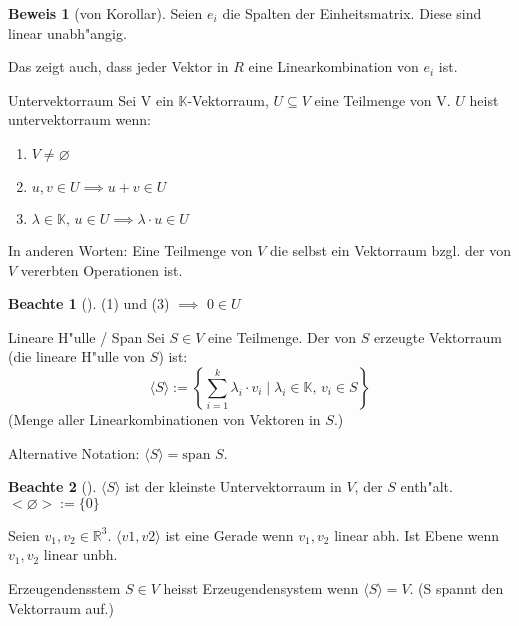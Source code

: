 \documentclass[oneside,fontsize=11pt,paper=a4,BCOR=0mm,DIV=12,automark,headsepline]{scrbook}
\theoremstyle{remark}
\theoremstyle{definition}
\newtheorem*{notte}{Beachte}
\theoremstyle{definition}
\newtheorem*{prof}{Beweis}
\theoremstyle{remark}
\begin{document}
\begin{prof}[von Korollar]
  Seien \(e_i\) die Spalten der Einheitsmatrix. Diese sind linear unabh"angig. 

  Das zeigt auch, dass jeder Vektor in \(R\) eine Linearkombination von \(e_i\) ist. 
\end{prof}

\begin{definition}{Untervektorraum}{}
  Sei V ein \(\mathbb{K}\)-Vektorraum, \(U\subseteq V\) eine Teilmenge von V. \(U\) heist
  untervektorraum wenn:
  \begin{enumerate}
  \item \(V\not= \varnothing\)
  \item $u, v \in U \implies u+v \in U$

  \item $\lambda \in \mathbb{K},\, u \in U \implies \lambda \cdot u \in U $
  \end{enumerate}

  In anderen Worten: Eine Teilmenge von \(V\) die selbst ein Vektorraum bzgl.
  der von \(V\) vererbten Operationen ist.
\end{definition}

\begin{notte}[]
  (1) und (3) \(\implies\) \(0\in U\)
\end{notte}

\begin{definition}{Lineare H"ulle / Span}{}
  Sei \(S \in V\) eine Teilmenge. Der von \(S\) erzeugte Vektorraum (die lineare H"ulle
  von \(S\)) ist: \[\langle S \rangle:=\left\{\sum_{i=1}^k{\lambda_i \cdot v_i}\mid \lambda_i \in \mathbb{K}, \, v_i \in S \right\}\] (Menge aller Linearkombinationen von Vektoren in \(S\).)

  Alternative Notation: \(\langle S \rangle=\text{span }S\).
\end{definition}

\begin{notte}[]
  \(\langle S \rangle\) ist der kleinste Untervektorraum in \(V\), der \(S\) enth"alt. 
  \(<\varnothing >:=\{0\}\)
\end{notte}

\begin{exa}
  Seien \(v_1, v_2 \in \mathbb{R}^3\).
  \(\langle v1,v2 \rangle\) ist eine Gerade wenn \(v_1,v_2\) linear abh. Ist Ebene wenn \(v_1,v_2\)
  linear unbh.
\end{exa}

\begin{definition}{Erzeugendensstem}{}
  \(S\in V\) heisst Erzeugendensystem wenn \(\langle S \rangle=V\). (S spannt den Vektorraum auf.)
\end{definition}
\end{document}
